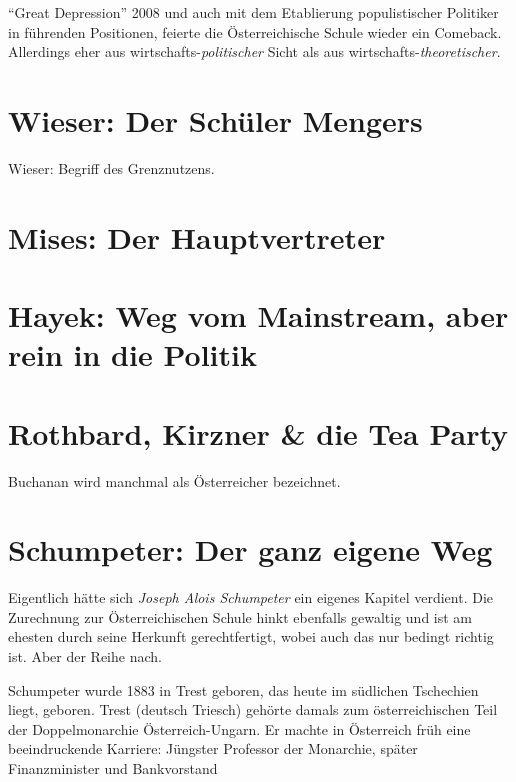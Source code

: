 "`Great Depression"' 2008 und auch mit dem Etablierung populistischer Politiker in  führenden Positionen, feierte die Österreichische Schule wieder ein Comeback. Allerdings eher aus wirtschafts-\textit{politischer} Sicht als aus wirtschafts-\textit{theoretischer}.

\section{Wieser: Der Schüler Mengers}
Wieser: Begriff des Grenznutzens. 

\section{Mises: Der Hauptvertreter}

\section{Hayek: Weg vom Mainstream, aber rein in die Politik}

\section{Rothbard, Kirzner \& die Tea Party}
Buchanan wird manchmal als Österreicher bezeichnet.

\section{Schumpeter: Der ganz eigene Weg}
Eigentlich hätte sich \textit{Joseph Alois Schumpeter} ein eigenes Kapitel verdient. Die Zurechnung zur Österreichischen Schule hinkt ebenfalls gewaltig und ist am ehesten durch seine Herkunft gerechtfertigt, wobei auch das nur bedingt richtig ist. Aber der Reihe nach.

Schumpeter wurde 1883 in Trest geboren, das heute im südlichen Tschechien liegt, geboren. Trest (deutsch Triesch) gehörte damals zum österreichischen Teil der Doppelmonarchie Österreich-Ungarn. Er machte in Österreich früh eine beeindruckende Karriere: Jüngster Professor der Monarchie, später Finanzminister und Bankvorstand

